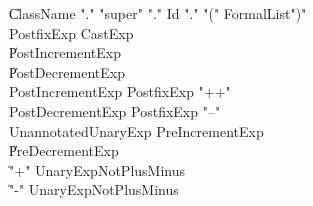 {\begin{grammar}
    \| ClassName \xcd"." \xcd"super"  \xcd"." Id \xcd"." \xcd"(" FormalList\opt \xcd")"\\
 PostfixExp  \: CastExp\\
    \| PostIncrementExp\\
    \| PostDecrementExp\\
 PostIncrementExp  \: PostfixExp \xcd"++"\\
 PostDecrementExp  \: PostfixExp \xcd"--"\\
 UnannotatedUnaryExp  \: PreIncrementExp\\
    \| PreDecrementExp\\
    \| \xcd"+" UnaryExpNotPlusMinus\\
    \| \xcd"-" UnaryExpNotPlusMinus\\
\end{grammar}

\begin{grammar}


\end{grammar}}
